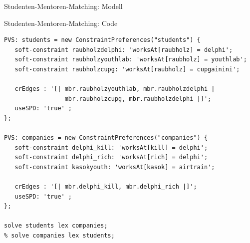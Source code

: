 \begin{frame}[fragile]{Studenten-Mentoren-Matching: Modell}
\begin{center}
\end{center}
\end{frame}

\begin{frame}[fragile]{Studenten-Mentoren-Matching: Code}
\begin{lstlisting}
PVS: students = new ConstraintPreferences("students") {
   soft-constraint raubholzdelphi: 'worksAt[raubholz] = delphi';
   soft-constraint raubholzyouthlab: 'worksAt[raubholz] = youthlab';
   soft-constraint raubholzcupg: 'worksAt[raubholz] = cupgainini';
   
   crEdges : '[| mbr.raubholzyouthlab, mbr.raubholzdelphi | 
                 mbr.raubholzcupg, mbr.raubholzdelphi |]';
   useSPD: 'true' ;
}; 

PVS: companies = new ConstraintPreferences("companies") {
   soft-constraint delphi_kill: 'worksAt[kill] = delphi';
   soft-constraint delphi_rich: 'worksAt[rich] = delphi';
   soft-constraint kasokyouth: 'worksAt[kasok] = airtrain';
   
   crEdges : '[| mbr.delphi_kill, mbr.delphi_rich |]';
   useSPD: 'true' ;
}; 

solve students lex companies;
% solve companies lex students;
\end{lstlisting}
\end{frame}

